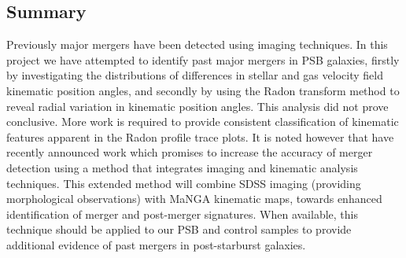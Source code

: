 \subsection{Summary}
\label{summary}
Previously major mergers have been detected using imaging techniques. In this project we have attempted to identify past major mergers in PSB galaxies, firstly by investigating the distributions of differences in stellar and gas velocity field kinematic position angles, and secondly by using the Radon transform method to reveal radial variation in kinematic position angles. This analysis did not prove conclusive. More work is required to provide consistent classification of kinematic features apparent in the Radon profile trace plots. It is noted however that \cite{2019DDA....5020304N} have recently announced work which promises to increase the accuracy of merger detection using a method that integrates imaging and kinematic analysis techniques. This extended method will combine SDSS imaging (providing morphological observations) with MaNGA  kinematic maps, towards enhanced identification of merger and post-merger signatures. When available, this technique should be applied to our PSB and control samples to provide additional evidence of past mergers in post-starburst galaxies.
